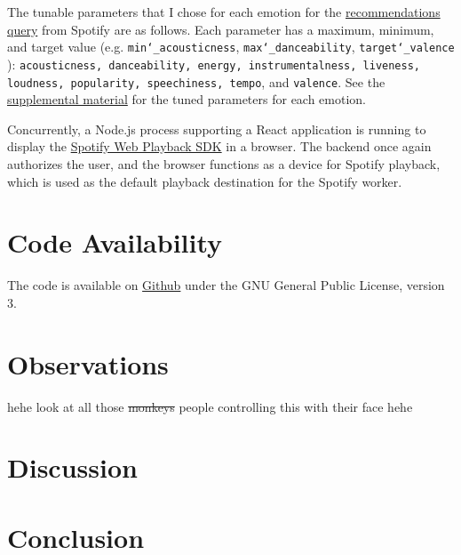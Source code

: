 \documentclass{article}
\renewcommand{\_}[1]{\underline{ #1 }}
\theoremstyle{definition}
\begin{document}
The tunable parameters that I chose for each emotion for the \href{https://developer.spotify.com/documentation/web-api/reference/#/operations/get-recommendationsrecommendation}{recommendations query} from Spotify are as follows. Each parameter has a maximum, minimum, and target value (e.g. \texttt{min\char`_acousticness}, \texttt{max\char`_danceability}, \texttt{target\char`_valence} ): \texttt{acousticness, danceability, energy, instrumentalness, liveness, loudness, popularity, speechiness, tempo}, and \texttt{valence}. See the \hyperref[Code Parameters]{supplemental material} for the tuned parameters for each emotion.

Concurrently, a Node.js process supporting a React application is running to display the \href{https://developer.spotify.com/documentation/web-playback-sdk/}{Spotify Web Playback SDK} in a browser. The backend once again authorizes the user, and the browser functions as a device for Spotify playback, which is used as the default playback destination for the Spotify worker. 

\section[Code Availability]{Code Availability}

The code is available on \href{https://github.com/as4mo3/face-the-music/}{Github} under the GNU General Public License, version 3. 

\section[Observations]{Observations}
\label{Observations}

hehe look at all those \sout{monkeys} people controlling this with their face hehe

\section[Discussion]{Discussion}
\label{Discussion}

\section[Conclusion]{Conclusion}
\label{Conclusion}

\end{document}
